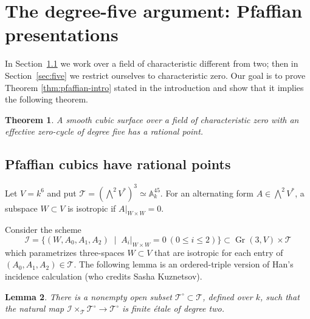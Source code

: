 \documentclass[a4paper,11pt]{amsart}
\numberwithin{equation}{section}
\newtheorem{theorem}{Theorem}[section]
\newtheorem{lemma}[theorem]{Lemma}
\theoremstyle{definition}
\theoremstyle{remark}
\newcommand{\A}{\mathbb A}
\newcommand{\Gr}{\operatorname{Gr}}
\newcommand{\Aff}{\A}
\newcommand{\cI}{\mathcal I}
\newcommand{\cT}{\mathcal T}
\begin{document}
\section{The degree-five argument: Pfaffian presentations}  \label{sec:degree-five}
In Section~\ref{sec:pfaffian} we work over a field of characteristic different from two; then in Section~\ref{sec:five} we restrict ourselves to characteristic zero.
Our goal is to prove Theorem \ref{thm:pfaffian-intro} stated in the introduction and show that it implies the following theorem.

\begin{theorem}\label{thm:five}
A smooth cubic surface over a field of characteristic zero with an
effective zero-cycle of degree five has a rational point.
\end{theorem}

\subsection{Pfaffian cubics have rational points}\label{sec:pfaffian}

Let $V=k^6$ and put $\cT=(\bigwedge^2V^*)^3\simeq\Aff^{45}_k$.
For an alternating form $A\in \bigwedge^2V^*$, a subspace $W\subset V$ is isotropic
if $A|_{W\times W}=0$.

Consider the scheme
    \[
 \cI=\{(W,A_0,A_1,A_2) \; \mid \;  A_i|_{W\times W}=0\ (0\le i\le2)\}
 \subset\Gr(3,V)\times\cT
\]
which parametrizes three-spaces $W\subset V$ that are isotropic for each entry of $(A_0,A_1,A_2)\in \cT$.
The following lemma is an ordered-triple version of Han's incidence calculation
\cite[Proposition~2.4]{Han} (who credits Sasha Kuznetsov).

\begin{lemma}
\label{lem:incidence}
  There is a nonempty open subset $\cT^\circ\subset\cT$, defined over
  $k$, such that 
 the natural map $\mathcal I\times_{\cT}\cT^\circ\to \cT^\circ$ is finite \'etale of degree two. 
\end{lemma}
\end{document}
